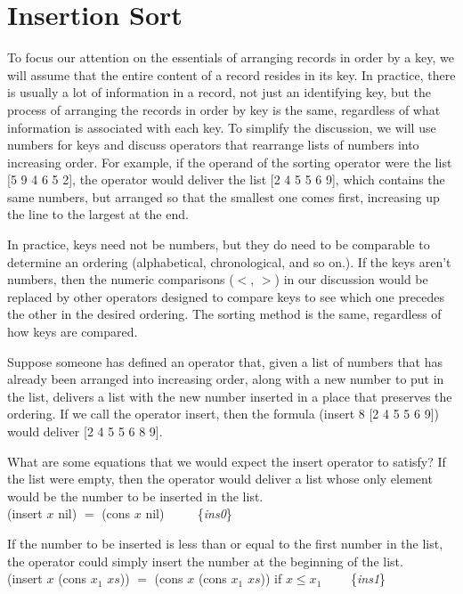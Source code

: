 \section{Insertion Sort}
\label{sec:insertion-sort}

To focus our attention on the essentials of
arranging records in order by a key, we will
assume that the entire content of a record
resides in its key.
In practice, there is usually a lot of information
in a record, not just an identifying key,
but the process of arranging the records
in order by key is the same, regardless
of what information is associated with each key.
To simplify the discussion,
we will use numbers for keys
and discuss operators that rearrange lists
of numbers into increasing order.
For example, if the operand of the sorting
operator were the list \textsf{[5 9 4 6 5 2]},
the operator would deliver the list \textsf{[2 4 5 5 6 9]},
which contains the same numbers, but arranged so
that the smallest one comes first, increasing up the
line to the largest at the end.

In practice, keys need not be numbers,
but they do need to be comparable
to determine an ordering (alphabetical, chronological, and so on.).
If the keys aren't numbers,
then the numeric comparisons
($<$, $>$) in our discussion would be replaced by
other operators designed to compare
keys to see which one precedes the other
in the desired ordering.
The sorting method is the same, regardless
of how keys are compared.

Suppose someone has defined an operator that,
given a list of numbers that has
already been arranged into increasing order,
along with a new number to put in the list,
delivers a list with the new number inserted
in a place that preserves the ordering.
If we call the operator \textsf{insert}, then
the formula \textsf{(insert 8 [2 4 5 5 6 9])} would
deliver \textsf{[2 4 5 5 6 8 9]}.

What are some equations that we would expect
the insert operator to satisfy?
If the list were empty, then the operator
would deliver a list whose only element would
be the number to be inserted in the list.
\vspace{2mm}\\
\hspace*{5mm}\textsf{(insert $x$ nil) $=$ (cons $x$ nil)} ~~~~ \{\emph{ins0}\}
\vspace{2mm}

If the number to be inserted is less than or equal to the
first number in the list, the operator could simply
insert the number at the beginning of the list.
\vspace{2mm}\\
\hspace*{5mm}\textsf{(insert $x$ (cons $x_1$ $xs$)) $=$ (cons $x$ (cons $x_1$ $xs$))} if $x \le x_1$ ~~~~\{\emph{ins1}\}
\vspace{2mm}

